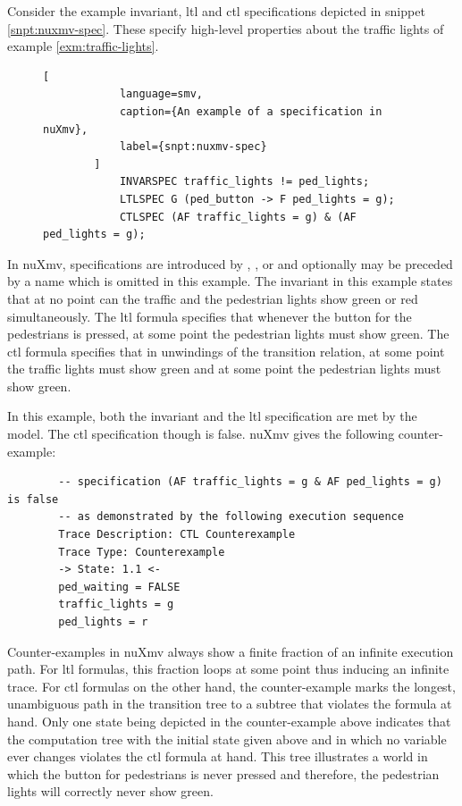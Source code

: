 \begin{example}
    Consider the example invariant, \gls{ltl} and \gls{ctl} specifications depicted in snippet \ref{snpt:nuxmv-spec}.
    These specify high-level properties about the traffic lights of example \ref{exm:traffic-lights}.

    \begin{figure}
        \begin{lstlisting}[
            language=smv,
            caption={An example of a specification in nuXmv},
            label={snpt:nuxmv-spec}
        ]
            INVARSPEC traffic_lights != ped_lights;
            LTLSPEC G (ped_button -> F ped_lights = g);
            CTLSPEC (AF traffic_lights = g) & (AF ped_lights = g);
        \end{lstlisting}
    \end{figure}


    In nuXmv, specifications are introduced by , , or  and optionally may be preceded by a name which is omitted in this example.
    The invariant in this example states that at no point can the traffic and the pedestrian lights show green or red simultaneously.
    The \gls{ltl} formula specifies that whenever the button for the pedestrians is pressed, at some point the pedestrian lights must show green.
    The \gls{ctl} formula specifies that in unwindings of the transition relation, at some point the traffic lights must show green and at some point the pedestrian lights must show green.

    In this example, both the invariant and the \gls{ltl} specification are met by the model.
    The \gls{ctl} specification though is false.
    nuXmv gives the following counter-example:

    \begin{lstlisting}
        -- specification (AF traffic_lights = g & AF ped_lights = g)  is false
        -- as demonstrated by the following execution sequence
        Trace Description: CTL Counterexample
        Trace Type: Counterexample
        -> State: 1.1 <-
        ped_waiting = FALSE
        traffic_lights = g
        ped_lights = r
    \end{lstlisting}

    Counter-examples in nuXmv always show a finite fraction of an infinite execution path.
    For \gls{ltl} formulas, this fraction loops at some point thus inducing an infinite trace.
    For \gls{ctl} formulas on the other hand, the counter-example marks the longest, unambiguous path in the transition tree to a subtree that violates the formula at hand.
    Only one state being depicted in the counter-example above indicates that the computation tree with the initial state given above and in which no variable ever changes violates the \gls{ctl} formula at hand.
    This tree illustrates a world in which the button for pedestrians is never pressed and therefore, the pedestrian lights will correctly never show green.


\end{example}
